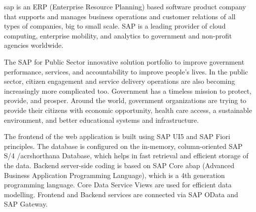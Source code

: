 \vspace{-1cm}


\acrfull{sap} is an ERP (Enterprise Resource Planning) based software product company that supports and
manages business operations and customer relations of all types of companies, big to small scale.
SAP is a leading provider of cloud computing, enterprise mobility, and analytics to government and non-profit agencies worldwide. 

The SAP for Public Sector innovative solution portfolio to improve government performance, services, and accountability to improve people’s lives.
In the public sector, citizen engagement and service delivery operations are also becoming increasingly more complicated too. Government has a timeless mission to protect, provide, and prosper. Around the world, government organizations are trying to provide their citizens with economic opportunity, health care access, a sustainable environment, and better educational systems and infrastructure.

The frontend of the web application is built using SAP UI5 and SAP Fiori principles. The database
is configured on the in-memory, column-oriented SAP S/4 /acrshort{hana} Database, which helps in fast
retrieval and efficient storage of the data. Backend server-side coding is based on SAP Core \acrfull{abap}
(Advanced Business Application Programming Language), which is a 4th generation
programming language. Core Data Service Views are used for efficient data modelling. Frontend
and Backend services are connected via SAP OData and SAP Gateway.


\pagebreak